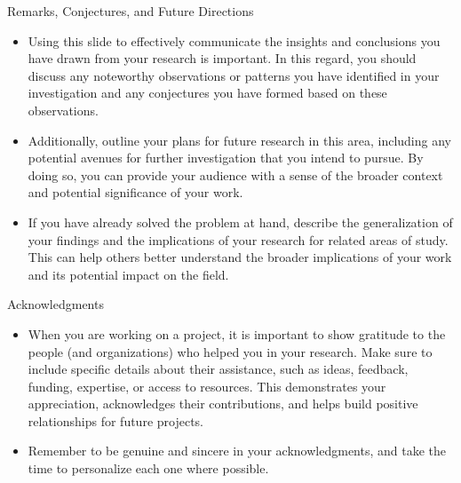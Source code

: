 \documentclass{beamer}
\begin{document}
\begin{frame}{Remarks, Conjectures, and Future Directions}
    \begin{itemize}
        \item[] Using this slide to effectively communicate the insights and conclusions you have drawn from your research is important. In this regard, you should discuss any noteworthy observations or patterns you have identified in your investigation and any conjectures you have formed based on these observations.\medskip

        \item[] Additionally, outline your plans for future research in this area, including any potential avenues for further investigation that you intend to pursue. By doing so, you can provide your audience with a sense of the broader context and potential significance of your work.\medskip

        \item[] If you have already solved the problem at hand, describe the generalization of your findings and the implications of your research for related areas of study. This can help others better understand the broader implications of your work and its potential impact on the field. 
    \end{itemize}
\end{frame}
\begin{frame}{Acknowledgments}
    \begin{itemize}
        \item[] When you are working on a project, it is important to show gratitude to the people (and organizations) who helped you in your research. Make sure to include specific details about their assistance, such as ideas, feedback, funding, expertise, or access to resources. This demonstrates your appreciation, acknowledges their contributions, and helps build positive relationships for future projects. \medskip
        
        \item[] Remember to be genuine and sincere in your acknowledgments, and take the time to personalize each one where possible. 
    \end{itemize}
\end{frame}
\end{document}
